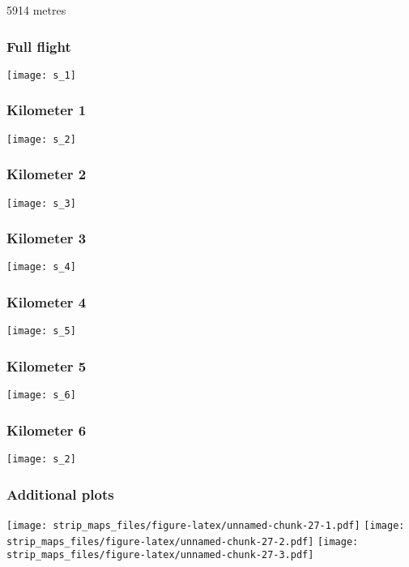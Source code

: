 \documentclass[]{article}
\begin{document}
5914 metres

\subsubsection{Full flight}\label{full-flight-18}

\texttt{[image: s\_1]}

\subsubsection{Kilometer 1}\label{kilometer-1-18}

\texttt{[image: s\_2]}

\subsubsection{Kilometer 2}\label{kilometer-2-18}

\texttt{[image: s\_3]}

\subsubsection{Kilometer 3}\label{kilometer-3-18}

\texttt{[image: s\_4]}

\subsubsection{Kilometer 4}\label{kilometer-4-17}

\texttt{[image: s\_5]}

\subsubsection{Kilometer 5}\label{kilometer-5-16}

\texttt{[image: s\_6]}

\subsubsection{Kilometer 6}\label{kilometer-6-12}

\texttt{[image: s\_2]}

\subsubsection{Additional plots}\label{additional-plots-18}

\texttt{[image: strip\_maps\_files/figure-latex/unnamed-chunk-27-1.pdf]}
\texttt{[image: strip\_maps\_files/figure-latex/unnamed-chunk-27-2.pdf]}
\texttt{[image: strip\_maps\_files/figure-latex/unnamed-chunk-27-3.pdf]}
\end{document}
